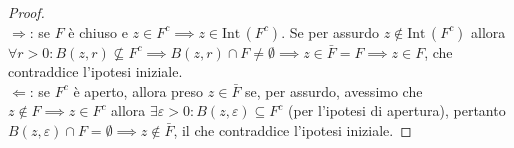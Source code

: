 \begin{proof} \hspace{1cm} \\
	$\boxed{\Rightarrow}$: se $F$ è chiuso e $z \in F^c \implies z \in \text{Int} \, (F^c)$. Se per assurdo $z \not\in \text{Int} \, (F^c)$ allora $\forall r > 0: B(z, r) \not\subseteq F^c \implies B(z, r) \cap F \neq \emptyset \implies z \in \bar{F} = F \implies z \in F$, che contraddice l'ipotesi iniziale. \\
	$\boxed{\Leftarrow}$: se $F^c$ è aperto, allora preso $z \in \bar{F}$ se, per assurdo, avessimo che $z \not\in F \implies z \in F^c$ allora $\exists \varepsilon > 0: B(z, \varepsilon) \subseteq F^c$ (per l'ipotesi di apertura), pertanto $B(z, \varepsilon) \cap F = \emptyset \implies z \not\in \bar{F}$, il che contraddice l'ipotesi iniziale. 
\end{proof}